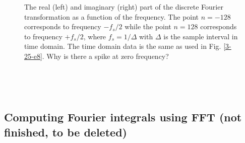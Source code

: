 \documentclass{article}
\begin{document}
\begin{figure}[h]
  \caption{\label{8-27-p1}The real (left) and imaginary (right) part of the
  discrete Fourier transformation as a function of the frequency. The point $n
  = - 128$ corresponds to frequency $- f_s / 2$ while the point $n = 128$
  corresponds to frequency $+ f_s / 2$, where $f_s = 1 / \Delta$ with $\Delta$
  is the sample interval in time domain. The time domain data is the same as
  used in Fig. \ref{3-25-e8}. Why is there a spike at zero frequency?}
\end{figure}

\

\

\subsection{Computing Fourier integrals using FFT (not finished, to be
deleted)}
\end{document}
